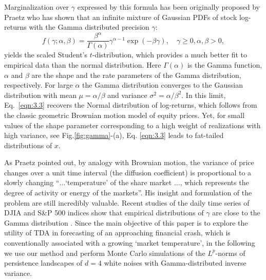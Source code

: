 \documentclass[preprint,12pt]{elsarticle}
\theoremstyle{definition}
\theoremstyle{remark}
\numberwithin{equation}{section}
\theoremstyle{definition}
\begin{document}
Marginalization over $\gamma$  expressed by this formula has been originally proposed by Praetz \cite{Praetz} who has shown that an infinite mixture of Gaussian PDFs of stock log-returns with the Gamma distributed precision  $\gamma$:
\begin{equation}\label{eqn:3.4}
 f(\gamma; \alpha, \beta)=\frac{\beta^\alpha}{\Gamma(\alpha)} \gamma^{\alpha-1}\exp(-\beta\gamma),\quad \gamma\geq 0,\alpha,\beta>0,
\end{equation}
yields the scaled Student's $t$-distribution, which provides a much better fit to empirical data than the normal distribution. Here  $\Gamma(\alpha)$ is the Gamma function,  $\alpha$ and $\beta$   are the shape and the rate parameters of the Gamma distribution, respectively. For large $\alpha$  the Gamma distribution converges to the Gaussian distribution with mean $\mu=\alpha/\beta$ and variance  $\sigma^2=\alpha/\beta^2$. In this limit, Eq.~\eqref{eqn:3.3} recovers the Normal distribution of log-returns, which follows from the classic geometric Brownian motion model of equity prices. Yet, for small values of the shape parameter corresponding to a high weight of realizations with high variance, see Fig.\ref{fig:gamma}-(a), Eq. \eqref{eqn:3.3} leads to fat-tailed distributions of $x$.

As Praetz  pointed out, by analogy with Brownian motion, the variance of price changes over a unit time interval (the diffusion coefficient) is proportional to a  slowly changing ``$\ldots$`temperature' of the share market $\ldots$, which represents the degree of activity or energy of the markets''. His insight and formulation of the problem are still incredibly valuable.
Recent studies of the daily time series of DJIA and S\&P 500 indices show that empirical distributions of $\gamma$  are close to the Gamma distribution \cite{Straeten,Micciche}.
Since the main objective of this paper is to explore the utility of TDA in forecasting of an approaching financial crash, which is conventionally associated with a growing `market temperature', in the following we use our method and perform Monte Carlo simulations of the  $L^p$-norms of persistence landscapes of $d=4$ white noises with Gamma-distributed inverse variance.
\end{document}
